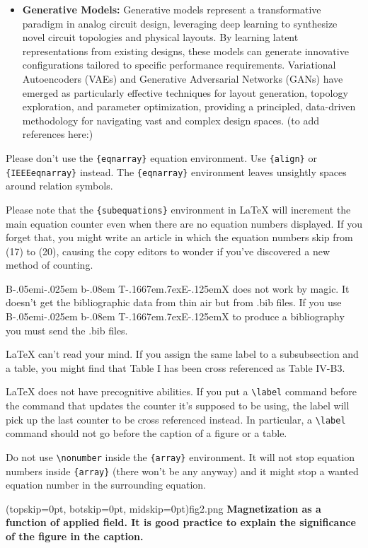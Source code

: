 \documentclass{ieeeaccess}
\def\BibTeX{{\rm B\kern-.05em{\sc i\kern-.025em b}\kern-.08em
    T\kern-.1667em\lower.7ex\hbox{E}\kern-.125emX}}
\begin{document}
\begin{itemize}
	\item \textbf{Generative Models:} Generative models represent a transformative paradigm in analog circuit design, leveraging deep learning to synthesize novel circuit topologies and physical layouts. By learning latent representations from existing designs, these models can generate innovative configurations tailored to specific performance requirements. Variational Autoencoders (VAEs) and Generative Adversarial Networks (GANs) have emerged as particularly effective techniques for layout generation, topology exploration, and parameter optimization, providing a principled, data-driven methodology for navigating vast and complex design spaces. (to add references here:)
	\end{itemize}
Please don't use the \verb|{eqnarray}| equation environment. Use
\verb|{align}| or \verb|{IEEEeqnarray}| instead. The \verb|{eqnarray}|
environment leaves unsightly spaces around relation symbols.

Please note that the \verb|{subequations}| environment in {\LaTeX}
will increment the main equation counter even when there are no
equation numbers displayed. If you forget that, you might write an
article in which the equation numbers skip from (17) to (20), causing
the copy editors to wonder if you've discovered a new method of
counting.

	{\BibTeX} does not work by magic. It doesn't get the bibliographic
data from thin air but from .bib files. If you use {\BibTeX} to produce a
bibliography you must send the .bib files.

	{\LaTeX} can't read your mind. If you assign the same label to a
subsubsection and a table, you might find that Table I has been cross
referenced as Table IV-B3.

{\LaTeX} does not have precognitive abilities. If you put a
\verb|\label| command before the command that updates the counter it's
supposed to be using, the label will pick up the last counter to be
cross referenced instead. In particular, a \verb|\label| command
should not go before the caption of a figure or a table.

Do not use \verb|\nonumber| inside the \verb|{array}| environment. It
will not stop equation numbers inside \verb|{array}| (there won't be
any anyway) and it might stop a wanted equation number in the
surrounding equation.


\Figure[t!](topskip=0pt, botskip=0pt, midskip=0pt){fig2.png}
{ \textbf{Magnetization as a function of applied field.
		It is good practice to explain the significance of the figure in the caption.}\label{fig2}}
\end{document}
